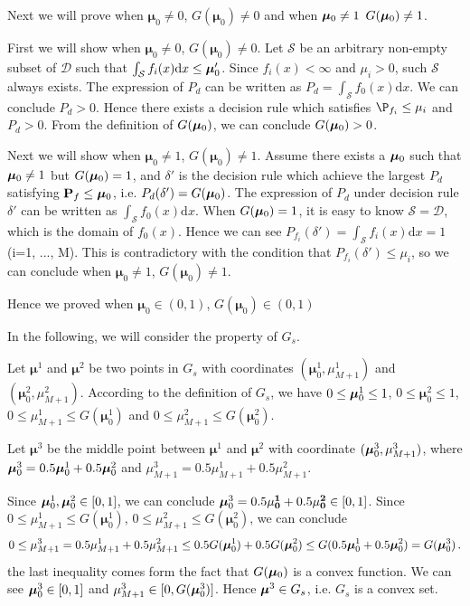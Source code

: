\documentclass[12pt,journal,a4paper,twoside,onecolumn]{IEEEtran}
\begin{document}
\begin{spacing}{2.5}
Next we will prove when $\boldsymbol{\mu}_0 \neq 0$, $G(\boldsymbol{\mu}_0) \neq 0$ and when $\boldsymbol{\mu}_0 \neq 1$ $G(\boldsymbol{\mu}_0) \neq 1$.

First we will show when $\boldsymbol{\mu}_0 \neq 0$, $G(\boldsymbol{\mu}_0) \neq 0$.
Let $\mathcal{S}$ be an arbitrary non-empty subset of $\mathcal{D}$ such that $\int_{\mathcal{S}}f_i(x)\mathrm{d}x \leq \boldsymbol{\mu}_0' $. Since $f_i(x) < \infty$ and $\mu_i > 0$, such $\mathcal{S}$ always exists.
The expression of $P_d$ can be written as $P_d= \int_{\mathcal{S}}f_{0}(x)\mathrm{d}x$. We can conclude $P_d > 0$. Hence there exists a decision rule which satisfies $\P_{f_i} \leq \mu_i$  and $P_d > 0$. From the definition of $G(\boldsymbol{\mu}_0)$, we can conclude $G(\boldsymbol{\mu}_0) > 0$. 

Next we will show when  $\boldsymbol{\mu}_0 \neq 1$, $G(\boldsymbol{\mu}_0) \neq 1$. Assume there exists a $\boldsymbol{\mu}_0$ such that $\boldsymbol{\mu}_0 \neq 1$ but $G(\boldsymbol{\mu}_0) = 1$, and $\delta'$ is the decision rule which achieve the largest $P_d$ satisfying $\mathbf{P}_f \leq \boldsymbol{\mu}_0$, i.e. $P_d(\delta') = G(\boldsymbol{\mu}_0)$. The expression of $P_d$ under decision rule $\delta'$ can be written as $\int_{\mathcal{S}}f_0(x)\mathrm{d}x$. When $G(\boldsymbol{\mu}_0) = 1$, it is easy to know $\mathcal{S} = \mathcal{D}$, which is the domain of $f_0(x)$. Hence we can see $P_{f_i}(\delta') = \int_{\mathcal{S}}f_i(x)\mathrm{d}x = 1$ (i=1, ..., M). This is contradictory with the condition that $P_{f_i}(\delta') \leq \mu_i$, so we can conclude when  $\boldsymbol{\mu}_0 \neq 1$, $G(\boldsymbol{\mu}_0) \neq 1$.

Hence we proved when $\boldsymbol{\mu}_0 \in (0, 1)$, $G(\boldsymbol{\mu}_0) \in (0, 1)$
 
In the following, we will consider the property of $G_s$. 

Let $\boldsymbol{\mu}^1$ and  $\boldsymbol{\mu}^2$ be two points in $G_s$ with coordinates $(\boldsymbol{\mu}^1_0, \mu_{M+1}^1)$ and $(\boldsymbol{\mu}^2_0, \mu_{M+1}^2)$. According to the definition of $G_s$, we have $0 \leq \boldsymbol{\mu}_0^1 \leq 1$, $0 \leq \boldsymbol{\mu}^2_0 \leq 1$, $0 \leq \mu_{M+1}^1 \leq G(\boldsymbol{\mu}_0^1)$ and  $0 \leq \mu_{M+1}^2 \leq G(\boldsymbol{\mu}_0^2)$.

Let $\boldsymbol{\mu}^3$ be the middle point between $\boldsymbol{\mu}^1$ and $\boldsymbol{\mu}^2$ with coordinate $(\boldsymbol{\mu}_0^3, \mu_{M+1}^3)$, where  $ \boldsymbol{\mu}_0^3 = 0.5\boldsymbol{\mu}_0^1 + 0.5 \boldsymbol{\mu}_0^2$ and $\mu_{M+1}^3 = 0.5 \mu_{M+1}^1 + 0.5 \mu_{M+1}^2$. 

Since $\boldsymbol{\mu}^1_0, \boldsymbol{\mu}^2_0 \in [0, 1]$, we can conclude $\boldsymbol{\mu}_0^3 = 0.5 \mathbf{\mu^1_0}+ 0.5\mathbf{\mu^2_0} \in [0, 1]$. Since $0 \leq \mu_{M+1}^1 \leq G(\boldsymbol{\mu}_0^1)$,  $0 \leq \mu_{M+1}^2 \leq G(\boldsymbol{\mu}_0^2)$, we can conclude 
\[
0 \leq \mu_{M+1}^3 = 0.5\mu_{M+1}^1 + 0.5\mu_{M+1}^2 \leq 0.5 G(\boldsymbol{\mu}_0^1) + 0.5G(\boldsymbol{\mu}_0^2) \leq G(0.5 \boldsymbol{\mu}_0^1+0.5\boldsymbol{\mu}_0^2) = G(\boldsymbol{\mu}^3_0)\,.
\]
the last inequality comes form the fact that $G(\boldsymbol{\mu}_0)$  is a convex function. We can see $\boldsymbol{\mu}^3_0 \in [0, 1]$ and $\mu_{M+1}^3 \in [0, G(\boldsymbol{\mu}^3_0)]$. Hence $\boldsymbol{\mu}^3 \in G_s$, i.e. $G_s$  is a convex set.  


\end{spacing}
\end{document}
